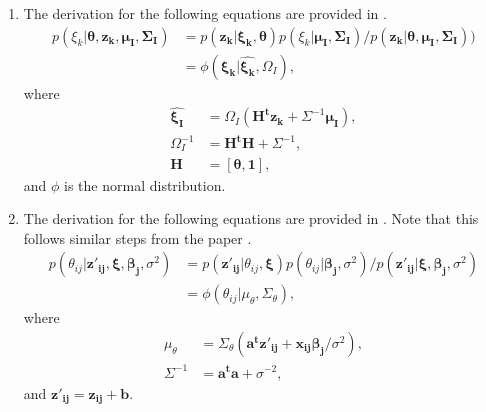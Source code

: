 \documentclass[12pt]{article}
\begin{document}
\begin{enumerate}
    \item The derivation for the following equations are provided in \cite{lindley1972bayes}.
        \begin{align*}
        p(\xi_k|\boldsymbol{\theta, z_k, \mu_I, \Sigma_I}) & = p(\boldsymbol{z_k|\xi_k, \theta})p(\xi_k|\boldsymbol{\mu_I, \Sigma_I})/p(\boldsymbol{z_k|\theta, \mu_I, \Sigma_I})) \\
        & = \phi(\boldsymbol{\xi_k}|\hat{\boldsymbol{\xi_k}}, \Omega_I),
        \end{align*} where
        \begin{align*}
            \hat{\boldsymbol{\xi_I}} & = \Omega_I(\boldsymbol{H^tz_k} + \Sigma^{-1}\boldsymbol{\mu_I}), \\
            \Omega_I^{-1} & = \boldsymbol{H^tH} + \Sigma^{-1}, \\
            \boldsymbol{H} & = [\boldsymbol{\theta, 1}],
        \end{align*}
        and $\phi$ is the normal distribution.
        
    \item The derivation for the following equations are provided in \cite{albert1992bayesian}. Note that this follows similar steps from the paper \cite{lindley1972bayes}.
    \begin{align*}
        p(\theta_{ij}| \boldsymbol{z'_{ij}, \xi, \beta_j,} \sigma^2) & = p(\boldsymbol{z'_{ij}}|\theta_{ij}, \boldsymbol{\xi}) p(\theta_{ij}|\boldsymbol{\beta_j}, \sigma^2)/p(\boldsymbol{z'_{ij}}|\boldsymbol{\xi, \beta_j,}\sigma^2)\\
        & = \phi(\theta_{ij}|\mu_\theta, \Sigma_\theta),
    \end{align*} where
    \begin{align*}
        \mu_\theta & = \Sigma_\theta(\boldsymbol{a^tz'_{ij} + x_{ij}\beta_j/}\sigma^2),\\
        \Sigma^{-1} & = \boldsymbol{a^ta} + \sigma^{-2},
    \end{align*}
    and $\boldsymbol{z'_{ij}} = \boldsymbol{z_{ij} + b}$.
    

\end{enumerate}
\end{document}

